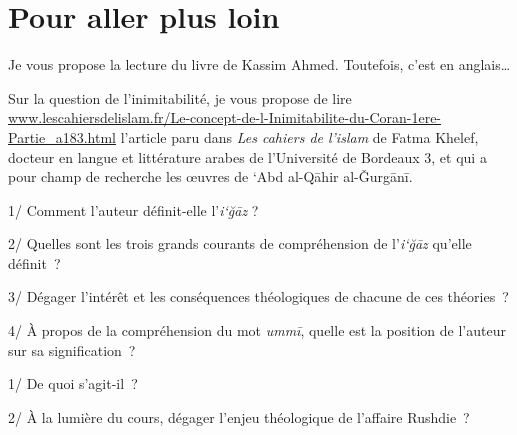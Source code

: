 \section{Pour aller plus loin}

 
{Je vous propose la lecture du livre de
Kassim Ahmed. Toutefois, c'est en anglais\ldots{}
}

Sur la question de l'inimitabilité, je vous propose de lire
\url{www.lescahiersdelislam.fr/Le-concept-de-l-Inimitabilite-du-Coran-1ere-Partie_a183.html} {l'article}
paru dans \emph{Les cahiers de l'islam} de Fatma Khelef, docteur en
langue et littérature arabes de l'Université de Bordeaux 3, et qui a
pour champ de recherche les œuvres de `Abd al-Qāhir al-Ǧurgānī.

1/ Comment l'auteur définit-elle l'\emph{i`ğāz} ?

2/ Quelles sont les trois grands courants de compréhension de
l'\emph{i`ğāz} qu'elle définit~?

3/ Dégager l'intérêt et les conséquences théologiques de chacune de ces
théories~?

4/ À propos de la compréhension du mot \emph{ummī}, quelle est la
position de l'auteur sur sa signification~?


1/ De quoi s'agit-il~?

2/ À la lumière du cours, dégager l'enjeu théologique de l'affaire
Rushdie~?

